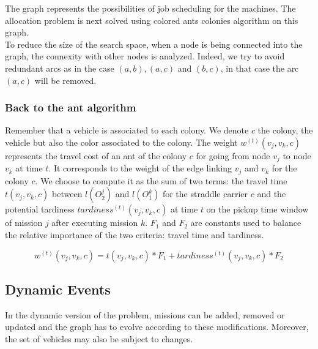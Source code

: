 \documentclass[a4paper,10pt]{article}
\begin{document}
The graph represents the possibilities of job scheduling for the machines. The allocation problem is next solved using colored ants colonies algorithm on this graph.\\

To reduce the size of the search space, when a node is being connected into the graph, the connexity with other nodes is analyzed. Indeed, we try to avoid redundant arcs as in the case $(a,b), (a,c)$ and $(b,c)$, in that case the arc $(a,c)$ will be removed.%

\subsubsection{Back to the ant algorithm}

Remember that a vehicle is associated to each colony. We denote $c$ the colony, the vehicle but also the color associated to the colony. The weight $w^{(t)}(v_j,v_k,c)$ represents the travel cost of an ant of the colony $c$ for going from node $v_j$ to node $v_k$ at time $t$. It corresponds to the weight of the edge linking $v_j$ and $v_k$ for the colony $c$. We choose to compute it as the sum of two terms: the travel time $t(v_j,v_k,c)$ between $l(O_2^j)$ and $l(O_1^k)$ for the straddle carrier $c$ and the potential tardiness $tardiness^{(t)}(v_j,v_k,c)$ at time $t$ on the pickup time window of mission $j$ after executing mission $k$. $F_1$ and $F_2$ are constants used to balance the relative importance of the two criteria: travel time and tardiness.

\begin{equation*}
  w^{(t)}(v_j,v_k,c) = t(v_j,v_k,c)*F_1 + tardiness^{(t)}(v_j,v_k,c)*F_2
\end{equation*}

\subsection{Dynamic Events}

In the dynamic version of the problem, missions can be added, removed or updated and the graph has to evolve according to these modifications. Moreover, the set of vehicles may also be subject to changes.\\
\end{document}
